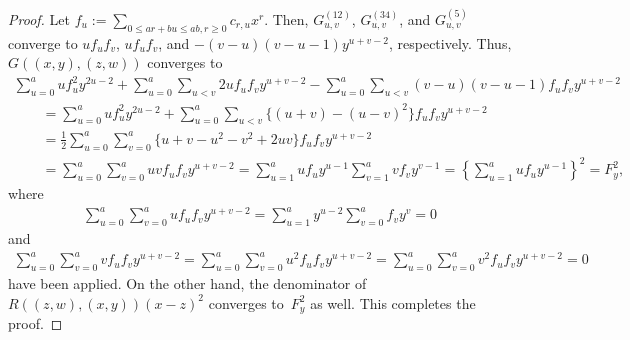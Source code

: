 \documentclass[pdftex]{sigma}
\numberwithin{equation}{section}
\theoremstyle{definition}
\begin{document}
\begin{proof}
Let $ f_u:=\sum\limits_{0\leq ar+bu\leq ab, r\geq 0}c_{r,u}x^{r}$. Then, $G^{(12)}_{u,v}$, $G^{(34)}_{u,v}$, and $G^{(5)}_{u,v}$ converge to $uf_uf_v$, $uf_uf_v$, and $-(v-u)(v-u-1)y^{u+v-2}$, respectively. Thus, $G((x,y),(z,w))$ converges to
\begin{gather*}
\sum_{u=0}^auf_u^2y^{2u-2}+\sum_{u=0}^a\sum_{u<v} 2uf_uf_vy^{u+v-2}-\sum_{u=0}^a\sum_{u<v}(v-u)(v-u-1)f_uf_vy^{u+v-2}\\
\qquad{} =\sum_{u=0}^auf_u^2y^{2u-2}+\sum_{u=0}^a\sum_{u<v}\big\{(u+v)-(u-v)^2\big\}f_uf_vy^{u+v-2}\\
\qquad{} =\frac{1}{2}\sum_{u=0}^a\sum_{v=0}^a\big\{u+v-u^2-v^2+2uv\big\}f_uf_vy^{u+v-2}\\
\qquad{} =\sum_{u=0}^a\sum_{v=0}^auvf_uf_vy^{u+v-2}=\sum_{u=1}^auf_uy^{u-1}\sum_{v=1}^avf_vy^{v-1}=\left\{\sum_{u=1}^auf_uy^{u-1}\right\}^2=F_y^2,
\end{gather*}
where
\begin{gather*}\sum_{u=0}^a\sum_{v=0}^auf_uf_vy^{u+v-2}=\sum_{u=1}^ay^{u-2}\sum_{v=0}^af_vy^v=0\end{gather*}
and
\begin{gather*}\sum_{u=0}^a\sum_{v=0}^avf_uf_vy^{u+v-2}=\sum_{u=0}^a\sum_{v=0}^au^2f_uf_vy^{u+v-2}=\sum_{u=0}^a\sum_{v=0}^av^2f_uf_vy^{u+v-2}=0\end{gather*}
have been applied. On the other hand, the denominator of $R((z,w),(x,y))(x-z)^2$ converges to~$F_y^2$ as well. This completes the proof.
\end{proof}
\end{document}
